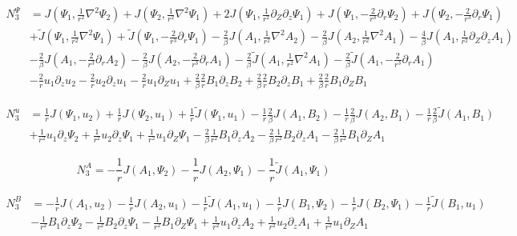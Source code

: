 \documentclass{emulateapj}
\newcommand{\beq}{\begin{equation}}
\newcommand{\eeq}{\end{equation}}
\begin{document}
\beq
\begin{split}
N_3^{\Psi} & = J(\Psi_1, \frac{1}{r^2} \nabla^2 \Psi_2) + J(\Psi_2, \frac{1}{r^2} \nabla^2\Psi_1) + 2 J (\Psi_1, \frac{1}{r^2}\partial_Z\partial_z \Psi_1) + J(\Psi_1, -\frac{2}{r^3}\partial_r \Psi_2) + J(\Psi_2, -\frac{2}{r^3}\partial_r \Psi_1) \\
& + \widetilde{J}(\Psi_1, \frac{1}{r^2} \nabla^2 \Psi_1) + \widetilde{J} (\Psi_1, -\frac{2}{r^3}\partial_r \Psi_1) - \frac{2}{\beta} J(A_1, \frac{1}{r^2}\nabla^2 A_2) - \frac{2}{\beta} J(A_2, \frac{1}{r^2}\nabla^2 A_1) - \frac{4}{\beta} J(A_1, \frac{1}{r^2}\partial_Z\partial_z A_1) \\ & - \frac{2}{\beta} J(A_1, -\frac{2}{r^3} \partial_r A_2 ) 
 - \frac{2}{\beta} J(A_2, -\frac{2}{r^3} \partial_r A_1) - \frac{2}{\beta} \widetilde{J} (A_1, \frac{1}{r^2} \nabla^2 A_1) - \frac{2}{\beta} \widetilde{J} (A_1, -\frac{2}{r^3} \partial_r A_1) \\
& - \frac{2}{r} u_1 \partial_z u_2 - \frac{2}{r} u_2 \partial_z u_1 - \frac{2}{r} u_1 \partial_Z u_1 + \frac{2}{\beta}\frac{2}{r} B_1\partial_z B_2 + \frac{2}{\beta}\frac{2}{r} B_2 \partial_z B_1 + \frac{2}{\beta} \frac{2}{r} B_1 \partial_Z B_1
\end{split}
\eeq

\beq
\begin{split}
N_3^u & = \frac{1}{r}J\left(\Psi_1, u_2\right) + \frac{1}{r}J\left(\Psi_2, u_1\right) + \frac{1}{r}\widetilde{J} \left(\Psi_1, u_1\right) - \frac{1}{r}\frac{2}{\beta} J\left(A_1, B_2\right) - \frac{1}{r} \frac{2}{\beta} J\left(A_2, B_1\right) - \frac{1}{r}\frac{2}{\beta}\widetilde{J}\left(A_1, B_1\right) \\
& + \frac{1}{r^2} u_1\partial_z \Psi_2 + \frac{1}{r^2} u_2 \partial_z \Psi_1 + \frac{1}{r^2} u_1 \partial_Z \Psi_1 - \frac{2}{\beta} \frac{1}{r^2} B_1 \partial_z A_2 - \frac{2}{\beta} \frac{1}{r^2} B_2 \partial_z A_1 - \frac{2}{\beta} \frac{1}{r^2} B_1 \partial_Z A_1
\end{split}
\eeq

\beq
N_3^A = -\frac{1}{r} J\left(A_1, \Psi_2\right) - \frac{1}{r}J\left(A_2, \Psi_1\right) - \frac{1}{r} \widetilde{J}\left(A_1, \Psi_1\right)
\eeq

\beq
\begin{split}
N_3^B & = - \frac{1}{r} J\left(A_1, u_2\right) - \frac{1}{r} J\left(A_2, u_1\right) - \frac{1}{r}\widetilde{J}\left(A_1, u_1\right) - \frac{1}{r} J\left(B_1, \Psi_2\right) - \frac{1}{r} J\left(B_2, \Psi_1\right) - \frac{1}{r} \widetilde{J} \left(B_1, u_1\right) \\ & - \frac{1}{r^2} B_1\partial_z \Psi_2 - \frac{1}{r^2} B_2 \partial_z \Psi_1 - \frac{1}{r^2} B_1 \partial_Z \Psi_1 + \frac{1}{r^2} u_1 \partial_z A_2 + \frac{1}{r^2} u_2 \partial_z A_1 + \frac{1}{r^2} u_1 \partial_Z A_1
\end{split}
\eeq
\end{document}
